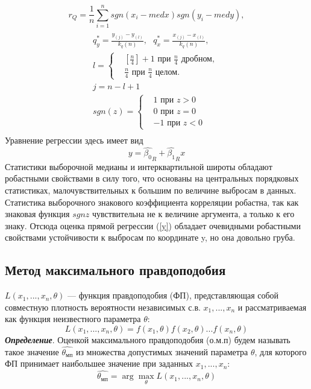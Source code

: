 \begin{equation}
	r_{Q} = \frac{1}{n}\sum_{i=1}^{n}{sgn(x_{i} - med x)sgn(y_{i} - med y)},
	\label{r_Q}
\end{equation}
\begin{multline}
	\\
	q^{*}_{y} = \frac{y_{(j)} -y_{(l)}}{k_{q}(n)},~~~
	q^{*}_{x} = \frac{x_{(j)} - x_{(l)}}{k_{q}(n)}, \\ 
	l = 
	\begin{cases}
		& [\frac{n}{4}] + 1 \text{ при } \frac{n}{4} \text{ дробном, } \\ 
		& \frac{n}{4} \text{ при } \frac{n}{4} \text{ целом. }
	\end{cases}\\
	j = n - l + 1\\
	sgn(z) = \begin{cases}
		& 1 \text{ при } z > 0 \\ 
		& 0 \text{ при } z = 0 \\
		& -1 \text{ при } z < 0
	\end{cases}\\
	\label{q*}        
\end{multline}
Уравнение регрессии здесь имеет вид 
\begin{equation}
	y = \hat{\beta_{0}}_{R} +  \hat{\beta_{1}}_{R}x
	\label{y}
\end{equation}
Статистики выборочной медианы и интерквартильной широты обладают робастными свойствами в силу того, что основаны на центральных порядковых статистиках, малочувствительных к большим по величине выбросам в данных. Статистика выборочного знакового коэффициента корреляции робастна, так как знаковая функция $sgn z$ чувствительна не к величине аргумента, а только к его знаку. Отсюда оценка прямой регрессии (\ref{y}) обладает очевидными робастными свойствами устойчивости к выбросам по координате y, но она довольно груба.

\subsection{Метод максимального правдоподобия}
\noindent $L(x_{1},... ,x_{n}, \theta)$ — функция правдоподобия (ФП), представляющая собой совместную плотность вероятности независимых с.в. $x_{1}, ... ,x_{n}$ и рассматриваемая как функция неизвестного параметра $\theta$:
\begin{equation}
	L(x_{1},...,x_{n},\theta) = f(x_{1},\theta)f(x_{2},\theta)...f(x_{n}, \theta)
	\label{L()}
\end{equation}
\textbf{\textit{Определение}}. Оценкой максимального правдоподобия (о.м.п) будем называть такое значение $\hat{\theta_{мп}}$ из множества допустимых значений параметра $\theta$, для которого ФП принимает наибольшее значение при заданных $x_{1},...,x_{n}$:
\begin{equation}
	\hat{\theta_{мп}} = \arg \max_{\theta}L(x_{1},...,x_{n},\theta)
	\label{theta_mp}
\end{equation}

